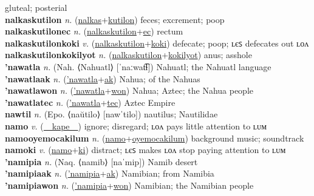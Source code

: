 gluteal; posterial \label{nalkasak} \\
\textbf{nalkaskutilon} \textit{n.} (\hyperref[nalkas]{nalkas}+\hyperref[kutilon]{kutilon})
feces; excrement; poop \label{nalkaskutilon} \\
\textbf{nalkaskutilonec} \textit{n.} (\hyperref[nalkaskutilon]{nalkaskutilon}+\hyperref[ec]{ec})
rectum \label{nalkaskutilonec} \\
\textbf{nalkaskutilonkoki} \textit{v.} (\hyperref[nalkaskutilon]{nalkaskutilon}+\hyperref[koki]{koki})
defecate; poop; ʟєꜱ defecates out ʟᴏᴧ \label{nalkaskutilonkoki} \\
\textbf{nalkaskutilonkokilyot} \textit{n.} (\hyperref[nalkaskutilon]{nalkaskutilon}+\hyperref[kokilyot]{kokilyot})
anus; asshole \label{nalkaskutilonkokilyot} \\
\textbf{'nawatla} \textit{n.} (Nah. ⟨Nahuatl⟩ [ˈnaːwat͡ɬ])
Nahuatl; the Nahuatl language \label{'nawatla} \\
\textbf{'nawatlaak} \textit{n.} (\hyperref['nawatla]{'nawatla}+\hyperref[ak]{ak})
Nahua; of the Nahuas \label{'nawatlaak} \\
\textbf{'nawatlawon} \textit{n.} (\hyperref['nawatla]{'nawatla}+\hyperref[won]{won})
Nahua; Aztec; the Nahua people \label{'nawatlawon} \\
\textbf{'nawatlatec} \textit{n.} (\hyperref['nawatla]{'nawatla}+\hyperref[tec]{tec})
Aztec Empire \label{'nawatlatec} \\
\textbf{nawtil} \textit{n.} (Epo. ⟨naŭtilo⟩ [nawˈtilo])
nautilus; Nautilidae \label{nawtil} \\
\textbf{namo} \textit{v.} (\hyperref[kape]{~~kape~~})
ignore; disregard; ʟᴏᴧ pays little attention to ʟᴜᴍ \label{namo} \\
\textbf{namooyemocakilum} \textit{n.} (\hyperref[namo]{namo}+\hyperref[oyemocakilum]{oyemocakilum})
background music; soundtrack \label{namooyemocakilum} \\
\textbf{namoki} \textit{v.} (\hyperref[namo]{namo}+\hyperref[ki]{ki})
distract; ʟєꜱ makes ʟᴏᴧ stop paying attention to ʟᴜᴍ \label{namoki} \\
\textbf{'namipia} \textit{n.} (Naq. ⟨namib⟩ [naˈmip])
Namib desert \label{'namipia} \\
\textbf{'namipiaak} \textit{n.} (\hyperref['namipia]{'namipia}+\hyperref[ak]{ak})
Namibian; from Namibia \label{'namipiaak} \\
\textbf{'namipiawon} \textit{n.} (\hyperref['namipia]{'namipia}+\hyperref[won]{won})
Namibian; the Namibian people \label{'namipiawon} \\
